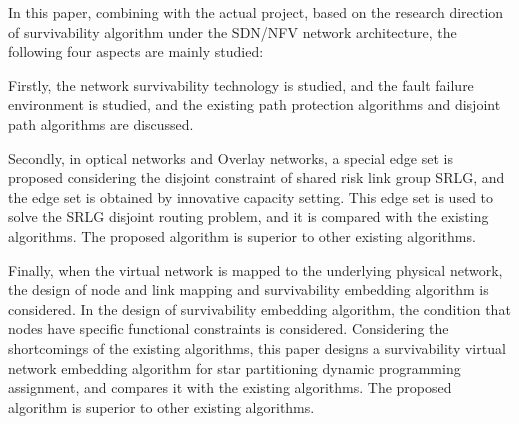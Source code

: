 {In this paper, combining with the actual project, based on the research direction of survivability algorithm under the SDN/NFV network architecture, the following four aspects are mainly studied:

Firstly, the network survivability technology is studied, and the fault failure environment is studied, and the existing path protection algorithms and disjoint path algorithms are discussed.

Secondly, in optical networks and Overlay networks, a special edge set is proposed considering the disjoint constraint of shared risk link group SRLG, and the edge set is obtained by innovative capacity setting. This edge set is used to solve the SRLG disjoint routing problem, and it is compared with the existing algorithms. The proposed algorithm is superior to other existing algorithms.


Finally, when the virtual network is mapped to the underlying physical network, the design of node and link mapping and survivability embedding algorithm is considered. In the design of survivability embedding algorithm, the condition that nodes have specific functional constraints is considered. Considering the shortcomings of the existing algorithms, this paper designs a survivability virtual network embedding algorithm for star partitioning dynamic programming assignment, and compares it with the existing algorithms. The proposed algorithm is superior to other existing algorithms.

}
\makecover
\clearpage
